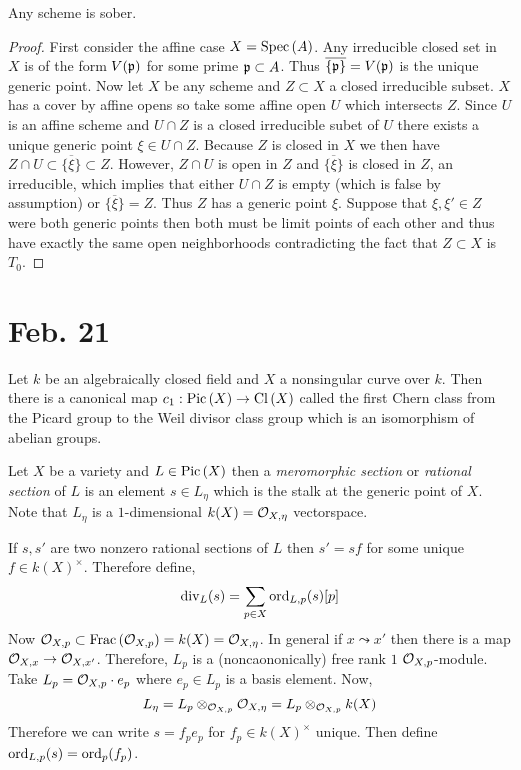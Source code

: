 \documentclass[12pt]{article}
\begin{document}
\begin{proposition}
Any scheme is sober. 
\end{proposition}

\begin{proof}
First consider the affine case $X = \mathrm{Spec}\left( A \right)$. Any irreducible closed set in $X$ is of the form $V(\mathfrak{p})$ for some prime $\mathfrak{p} \subset A$. Thus $\overline{\{ \mathfrak{p} \}} = V(\mathfrak{p})$ is the unique generic point. Now let $X$ be any scheme and $Z \subset X$ a closed irreducible subset. $X$ has a cover by affine opens so take some affine open $U$ which intersects $Z$. Since $U$ is an affine scheme and $U \cap Z$ is a closed irreducible subet of $U$ there exists a unique generic point $\xi \in U \cap Z$. Because $Z$ is closed in $X$ we then have $Z \cap U \subset \overline{\{\xi\}} \subset Z$. However, $Z \cap U$ is open in $Z$ and $\overline{\{\xi\}}$ is closed in $Z$, an irreducible, which implies that either $U \cap Z$ is empty (which is false by assumption) or $\overline{\{\xi\}} = Z$. Thus $Z$ has a generic point $\xi$. Suppose that $\xi, \xi' \in Z$ were both generic points then both must be limit points of each other and thus have exactly the same open neighborhoods contradicting the fact that $Z \subset X$ is $T_0$. 
\end{proof}

\section{Feb. 21}

\begin{theorem}
Let $k$ be an algebraically closed field and $X$ a nonsingular curve over $k$. Then there is a canonical map $c_1 : \mathrm{Pic} \left( X \right) \to \mathrm{Cl} \left( X \right)$ called the first Chern class from the Picard group to the Weil divisor class group which is an isomorphism of abelian groups. 
\end{theorem}

\begin{definition}
Let $X$ be a variety and $L \in \mathrm{Pic} \left( X \right)$ then a \textit{meromorphic section} or \textit{rational section} of $L$ is an element $s \in L_\eta$ which is the stalk at the generic point of $X$. Note that $L_\eta$ is a $1$-dimensional $k(X) = \mathcal{O}_{X, \eta}$ vectorspace. 
\end{definition}



\begin{definition}
If $s, s'$ are two nonzero rational sections of $L$ then $s' = s f$ for some unique $f \in k(X)^\times$. Therefore define,
\[ \mathrm{div}_L(s) = \sum_{p \in X} \mathrm{ord}_{L, p}(s) [p] \]
Now $\mathcal{O}_{X, p} \subset \mathrm{Frac}\left(\mathcal{O}_{X, p}\right) = k(X) = \mathcal{O}_{X, \eta}$. In general if $x \leadsto x'$ then there is a map $\mathcal{O}_{X, x} \to \mathcal{O}_{X, x'}$. Therefore, $L_p$ is a (noncaononically) free rank $1$ $\mathcal{O}_{X, p}$-module. Take $L_p = \mathcal{O}_{X, p} \cdot e_p$ where $e_p \in L_p$ is a basis element. Now, 
\[ L_\eta = L_p \otimes_{\mathcal{O}_{X, p}} \mathcal{O}_{X, \eta} = L_p \otimes_{\mathcal{O}_{X, p}} k(X) \]
Therefore we can write $s = f_p e_p$ for $f_p \in k(X)^\times$ unique. Then define $\mathrm{ord}_{L,p}(s) = \mathrm{ord}_p(f_p)$. 
\end{definition}
\end{document}

